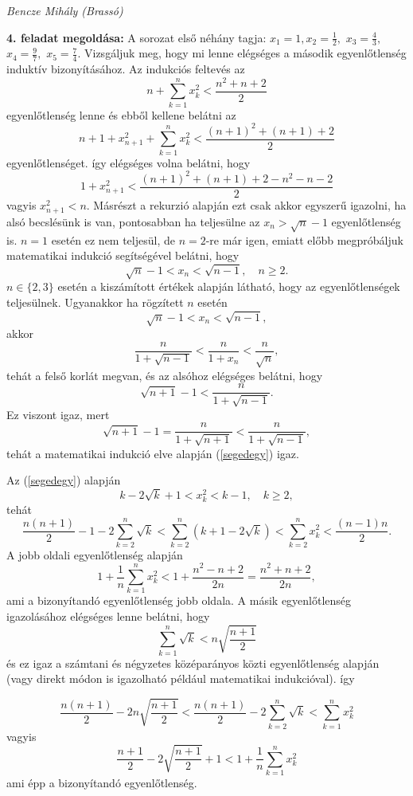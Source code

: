 \documentclass[a4paper,10pt]{article}
\def\ki#1#2{\hfill {\it #1 (#2)}\medskip}
\begin{document}
\ki{Bencze Mihály}{Brassó}\medskip

\textbf{4. feladat megoldása: } A sorozat első néhány tagja: $x_1=1, x_2=\frac
12,$ $x_3=\frac 43,$ $x_4=\frac 97,$ $x_5=\frac 74.$ Vizsgáljuk
meg, hogy mi lenne elégséges a második egyenlőtlenség
induktív bizonyításához. Az indukciós feltevés az
$$n+\sum\limits_{k=1}^n x_k^2<\frac{n^2+n+2}{2}$$ egyenl\H
otlenség lenne és ebből kellene belátni az
$$n+1+x_{n+1}^2+\sum\limits_{k=1}^n x_k^2<\frac{(n+1)^2+(n+1)+2}{2}$$
egyenlőtlenséget. így elégséges volna belátni, hogy
$$1+x_{n+1}^2<\frac{(n+1)^2+(n+1)+2-n^2-n-2}{2}$$ vagyis $x_{n+1}^2<n.$
Másrészt a rekurzió alapján ezt csak akkor egyszerű
igazolni, ha alsó becslésünk is van, pontosabban ha
teljesülne az $x_n>\sqrt{n}-1$ egyenlőtlenség is. $n=1$
esetén ez nem teljesül, de $n=2$-re már igen, emiatt előbb
meg\-pró\-báljuk mate\-matikai indukció segítségével
belátni, hogy
\begin{equation}\label{segedegy}\sqrt{n}-1<x_n<\sqrt{n-1},\quad
n\geq 2.\end{equation} $n\in \{2,3\}$ esetén a kiszámított
értékek alapján látható, hogy az egyenlőtlenségek
teljesülnek. Ugyanakkor ha rögzített $n$ esetén
$$\sqrt{n}-1<x_n<\sqrt{n-1},$$ akkor
$$\frac{n}{1+\sqrt{n-1}}<\frac{n}{1+x_n}<\frac{n}{\sqrt{n}},$$
tehát a felső korlát megvan, és az alsóhoz elégséges
belátni, hogy $$\sqrt{n+1}-1<\frac{n}{1+\sqrt{n-1}}.$$ Ez viszont
igaz, mert
$$\displaystyle\sqrt{n+1}-1=\frac{n}{1+\sqrt{n+1}}<\frac{n}{1+\sqrt{n-1}},$$
tehát a matematikai indukció elve alapján  (\ref{segedegy})
igaz.

Az (\ref{segedegy}) alapján $$k-2\sqrt{k}+1<x_k^2<k-1,\quad k\geq
2,$$ tehát
$$\frac{n(n+1)}{2}-1-2\sum_{k=2}^n \sqrt{k}<\sum\limits_{k=2}^n (k+1-2\sqrt{k})<\sum\limits_{k=2}^n x_k^2<\frac{(n-1)n}{2}.$$
A jobb oldali egyenlőtlenség alapján $$1+\frac 1n
\sum\limits_{k=1}^n x_k^2<1+\frac{n^2-n+2}{2n}=\frac{n^2+n+2}{2n},$$
ami a bizonyítandó egyenlőtlenség jobb oldala. A másik
egyenlőtlenség igazolásához elégséges lenne belátni,
hogy $$\sum\limits_{k=1}^n\sqrt{k}<n\sqrt{\frac{n+1}{2}}$$ és ez
igaz a számtani és négyzetes középarányos közti
egyenlőtlenség alapján (vagy direkt módon is igazolható
például matematikai indukcióval). így

$$\frac{n(n+1)}{2}-2n\sqrt{\frac{n+1}{2}}<\frac{n(n+1)}{2}-2\sum_{k=2}^n \sqrt{k}<\sum\limits_{k=1}^n x_k^2$$
vagyis
$$\frac{n+1}{2}- 2\sqrt{\frac{n+1}{2}} +1<1+\frac 1n \sum\limits_{k=1}^n
x_k^2$$ ami épp a bizonyítandó egyenlőtlenség.

\medskip
\end{document}
